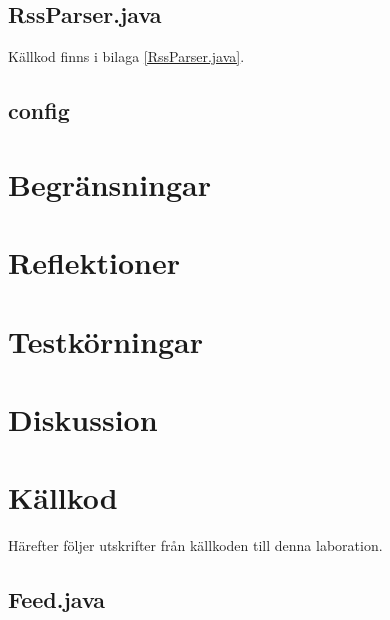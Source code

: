 \documentclass[a4paper, 12pt]{article}
\begin{document}
\subsection{RssParser.java}\label{RssParser}
Källkod finns i bilaga \ref{RssParser.java}.
\subsection{config}

\section{Begränsningar}\label{Begransningar}

\section{Reflektioner}\label{Reflektioner}

\section{Testkörningar}\label{Testkorningar}

\section{Diskussion}\label{Diskussion}


\newpage
\appendix
{}
\section{Källkod}\label{Kallkod}
Härefter följer utskrifter från källkoden till denna laboration.

\subsection{Feed.java}\label{Feed.java}
\begin{footnotesize}
  
\end{footnotesize}
\end{document}
